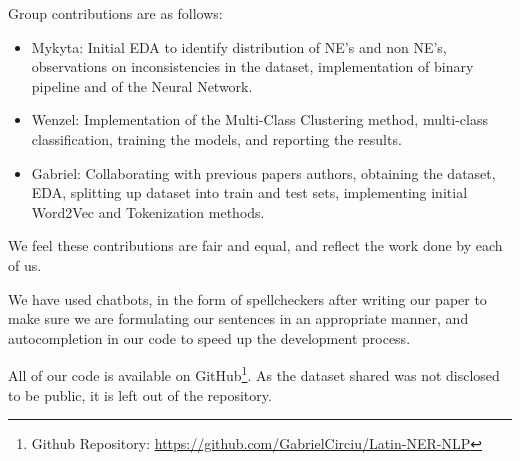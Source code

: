 \documentclass[11pt]{article}
\begin{document}
Group contributions are as follows:

\begin{itemize}
  \item Mykyta: Initial EDA to identify distribution of NE's and non NE's, observations on inconsistencies in the dataset, implementation of binary pipeline and of the Neural Network.
  \item Wenzel: Implementation of the Multi-Class Clustering method, multi-class classification, training the models, and reporting the results.
  \item Gabriel: Collaborating with previous papers authors, obtaining the dataset, EDA, splitting up dataset into train and test sets, implementing initial Word2Vec and Tokenization methods.
\end{itemize}

We feel these contributions are fair and equal, and reflect the work done by each of us.

We have used chatbots, in the form of spellcheckers after writing our paper to make sure we are formulating our sentences in an appropriate manner,
and autocompletion in our code to speed up the development process.

All of our code is available on GitHub\footnote{Github Repository: \url{https://github.com/GabrielCirciu/Latin-NER-NLP}}. As the dataset shared
was not disclosed to be public, it is left out of the repository.



\end{document}
